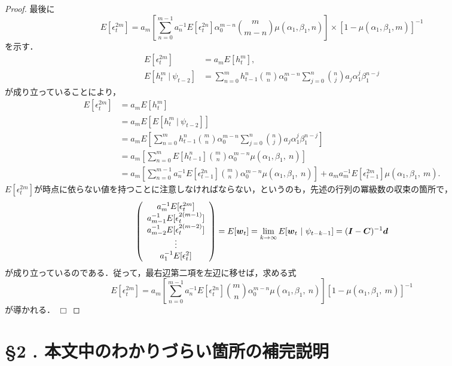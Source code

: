 \documentclass[8pt]{jsarticle}
\newcommand{\Section}[2]{\section*{\S #1 .\hspace{5pt} #2}}
\newtheorem{proof}{証明}
\def\qed{\hfill $\Box$}
\def\vector#1{\mbox{\boldmath $#1$}}
\begin{document}
\begin{proof}
最後に
\[
	E[\epsilon_t^{2m}] = a_m \left[ \sum_{n=0}^{m-1} a_n^{-1} E[\epsilon_t^{2n}] \alpha_0^{m-n} \binom{m}{m-n} \mu(\alpha_1, \beta_1, n) \right]
		\times \left[ 1-\mu(\alpha_1, \beta_1, m) \right]^{-1}
\]
を示す．
\begin{align*}
	E[\epsilon_t^{2m}] &= a_m E[h_t^m], \\
	E[h_t^m\ |\ \psi_{t-2}] &= \sum_{n=0}^{m}　h_{t-1}^n \binom{m}{n} \alpha_0^{m-n} \sum_{j=0}^{n} \binom{n}{j} a_j \alpha_1^j \beta_1^{n-j}
\end{align*}
が成り立っていることにより，
\begin{align*}
	E[\epsilon_t^{2m}] &= a_m E[h_t^m] \\
	&= a_m E\left[ E[h_t^m\ |\ \psi_{t-2}] \right] \\
	&= a_m E\left[ \sum_{n=0}^{m}　h_{t-1}^n \binom{m}{n} \alpha_0^{m-n} \sum_{j=0}^{n} \binom{n}{j} a_j \alpha_1^j \beta_1^{n-j} \right] \\
	&= a_m \left[ \sum_{n=0}^{m}　E[h_{t-1}^n] \binom{m}{n} \alpha_0^{m-n} \mu(\alpha_1,\beta_1,\ n) \right] \\
	&= a_m \left[ \sum_{n=0}^{m-1}　a_n^{-1} E[\epsilon_{t-1}^{2n}] \binom{m}{n} \alpha_0^{m-n} \mu(\alpha_1,\beta_1,\ n) \right] + a_m a_m^{-1}  E[\epsilon_{t-1}^{2m}] \mu(\alpha_1,\beta_1,\ m).
\end{align*}
$E[\epsilon_t^{2m}] が時点に依らない値を持つことに注意しなければならない，というのも，先述の行列の冪級数の収束の箇所で，$
\[
	\left(
	\begin{array}{c}
		a_m^{-1} E[\epsilon_t^{2m}] \\
		a_{m-1}^{-1} E[\epsilon_t^{2(m-1)}] \\
		a_{m-2}^{-1} E[\epsilon_t^{2(m-2)}] \\
		\vdots \\
		a_1^{-1} E[\epsilon_t^2]
	\end{array}
	\right)
	= E[\vector{w}_t] = \lim_{k \to \infty} E[\vector{w}_t\ |\ \psi_{t-k-1}] = (\vector{I} - \vector{C})^{-1} \vector{d}
\]
が成り立っているのである．従って，最右辺第二項を左辺に移せば，求める式
\[
	E[\epsilon_t^{2m}] = a_m \left[ \sum_{n=0}^{m-1}　a_n^{-1} E[\epsilon_t^{2n}] \binom{m}{n} \alpha_0^{m-n} \mu(\alpha_1,\beta_1,\ n) \right] [1 - \mu(\alpha_1,\beta_1,\ m)]^{-1}
\]
が導かれる．
\qed
\end{proof}

\Section{2}{本文中のわかりづらい箇所の補完説明}
\end{document}
